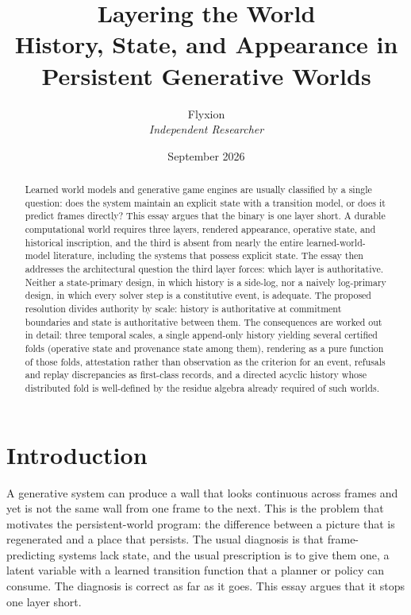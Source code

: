\documentclass[11pt]{article}
\title{\textbf{Layering the World}\\
\large History, State, and Appearance in Persistent Generative Worlds}
\author{Flyxion\\ \textit{Independent Researcher}}
\date{September 2026}
\begin{document}
\maketitle

\begin{abstract}
\noindent Learned world models and generative game engines are usually classified by a single question: does the system maintain an explicit state with a transition model, or does it predict frames directly? This essay argues that the binary is one layer short. A durable computational world requires three layers, rendered appearance, operative state, and historical inscription, and the third is absent from nearly the entire learned-world-model literature, including the systems that possess explicit state. The essay then addresses the architectural question the third layer forces: which layer is authoritative. Neither a state-primary design, in which history is a side-log, nor a naively log-primary design, in which every solver step is a constitutive event, is adequate. The proposed resolution divides authority by scale: history is authoritative at commitment boundaries and state is authoritative between them. The consequences are worked out in detail: three temporal scales, a single append-only history yielding several certified folds (operative state and provenance state among them), rendering as a pure function of those folds, attestation rather than observation as the criterion for an event, refusals and replay discrepancies as first-class records, and a directed acyclic history whose distributed fold is well-defined by the residue algebra already required of such worlds.
\end{abstract}

\section{Introduction}

A generative system can produce a wall that looks continuous across frames and yet is not the same wall from one frame to the next. This is the problem that motivates the persistent-world program: the difference between a picture that is regenerated and a place that persists. The usual diagnosis is that frame-predicting systems lack state, and the usual prescription is to give them one, a latent variable with a learned transition function that a planner or policy can consume. The diagnosis is correct as far as it goes. This essay argues that it stops one layer short.
\end{document}

